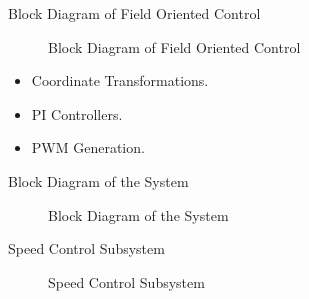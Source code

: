 \begin{frame}{Block Diagram of Field Oriented Control}
	\begin{figure}
		\centering

		\caption{Block Diagram of Field Oriented Control}
	\end{figure}
	\begin{itemize}
		\item Coordinate Transformations.
		\item PI Controllers.
		\item PWM Generation.
	\end{itemize}
\end{frame}

\begin{frame}{Block Diagram of the System}
	\begin{figure}
		\centering

		\caption{Block Diagram of the System}
	\end{figure}
\end{frame}

\begin{frame}{Speed Control Subsystem}
	\begin{figure}
		\centering

		\caption{Speed Control Subsystem}
	\end{figure}
\end{frame}

